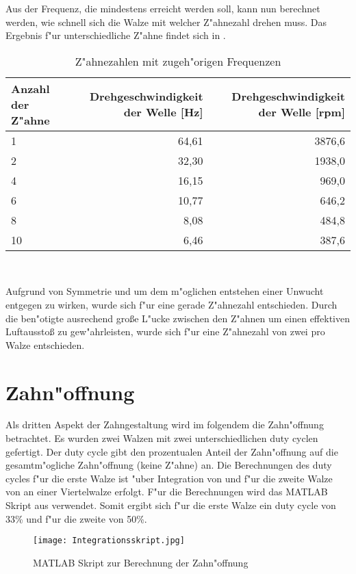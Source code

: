 Aus der Frequenz, die mindestens erreicht werden soll, kann nun berechnet werden, wie schnell sich die Walze mit welcher Z"ahnezahl drehen muss. Das Ergebnis f"ur unterschiedliche Z"ahne findet sich in .\\
\begin{table}[h]
	\centering
	\begin{tabular}{lrr}
		\toprule
		Anzahl der Z"ahne & Drehgeschwindigkeit der Welle [Hz] & Drehgeschwindigkeit der Welle [rpm]\\
		\midrule
		1 & 64,61 & 3876,6\\
		2 & 32,30 & 1938,0\\
		4 & 16,15 & 969,0\\
		6 & 10,77 & 646,2\\
		8 & 8,08 & 484,8\\
		10 & 6,46 & 387,6\\
		\bottomrule
	\end{tabular}\\
	\caption{Z"ahnezahlen mit zugeh"origen Frequenzen}
	\label{tab:zahnezahl}
\end{table}

Aufgrund von Symmetrie und um dem m"oglichen entstehen einer Unwucht entgegen zu wirken, wurde sich f"ur eine gerade Z"ahnezahl entschieden. Durch die ben"otigte ausrechend gro\ss{}e L"ucke zwischen den Z"ahnen um einen effektiven Luftaussto\ss{} zu gew"ahrleisten, wurde sich f"ur eine Z"ahnezahl von zwei pro Walze entschieden.\\

\section{Zahn"offnung}
Als dritten Aspekt der Zahngestaltung wird im folgendem die Zahn"offnung betrachtet. Es wurden zwei Walzen mit zwei unterschiedlichen duty cyclen gefertigt. Der duty cycle gibt den prozentualen Anteil der Zahn"offnung auf die gesamtm"ogliche Zahn"offnung (keine Z"ahne) an. Die Berechnungen des duty cycles f"ur die erste Walze ist "uber Integration von  und f"ur die zweite Walze von  an einer Viertelwalze erfolgt. F"ur die Berechnungen wird das MATLAB Skript aus  verwendet. Somit ergibt sich f"ur die erste Walze ein duty cycle von 33\% und f"ur die zweite von 50\%.
\begin{figure}[h]
	\centering
	\texttt{[image: Integrationsskript.jpg]}
	\caption{MATLAB Skript zur Berechnung der Zahn"offnung}
	\label{fig:Integrationsskript}
\end{figure}\\

